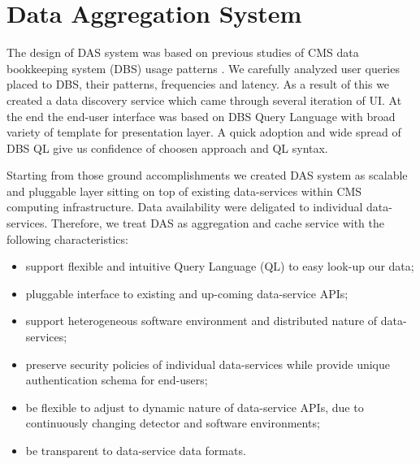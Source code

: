 \documentclass[a4paper]{jpconf}
\begin{document}
\section{Data Aggregation System\label{DAS}}
The design of DAS system was based on previous studies of CMS 
data bookkeeping system (DBS) usage patterns \cite{DBS07}. We carefully analyzed user
queries placed to DBS, their patterns, frequencies and latency. As a result of this
we created a data discovery service \cite{DD} which came through several iteration
of UI. At the end the end-user interface was based on DBS Query Language \cite{DBS-QL}
with broad variety of template for presentation layer. A quick adoption
and wide spread of DBS QL give us confidence of choosen approach and QL syntax.

Starting from those ground accomplishments we created DAS system as
scalable and pluggable layer sitting on top of existing data-services
within CMS computing infrastructure. Data availability were deligated to individual
data-services. Therefore, we treat DAS as aggregation and cache service 
with the following characteristics:
\begin{itemize}
\item support flexible and intuitive Query Language (QL) to easy look-up our
data;
\item pluggable interface to existing and up-coming data-service APIs;
\item support heterogeneous software environment and distributed nature of data-services;
\item preserve security policies of individual data-services while provide unique
authentication schema for end-users;
\item be flexible to adjust to dynamic nature of data-service APIs, 
due to continuously changing detector and software environments;
\item be transparent to data-service data formats.
\end{itemize}
\end{document}
